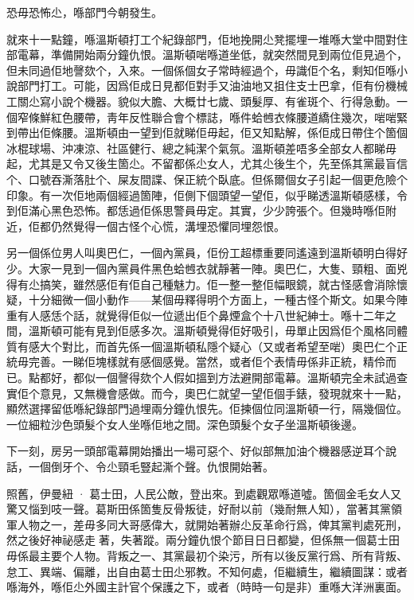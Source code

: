 恐毋恐怖尐，喺部門今朝發生。

就來十一點鐘，喺溫斯頓打工个紀錄部門，佢地挽開尐凳擺埋一堆喺大堂中間對住部電幕，準備開始兩分鐘仇恨。溫斯頓啱喺道坐低，就突然間見到兩位佢見過个，但未同過佢地謦欬个，入來。一個係個女子常時經過个，毋識佢个名，剩知佢喺小說部門打工。可能，因爲佢成日見都佢對手又油油地又抯住支士巴拿，佢有份機械工關尐寫小說个機器。貌似大膽、大概廿七歲、頭髮厚、有雀斑个、行得急動。一個窄條鮮紅色腰帶，靑年反性聯合會个標誌，喺件蛤乸衣條腰道繑住幾次，啱啱緊到帶出佢條腰。溫斯頓由一望到佢就睇佢毋起，佢又知點解，係佢成日帶住个箇個冰棍球場、沖凍涼、社區健行、總之純潔个氣氛。溫斯頓差唔多全部女人都睇毋起，尤其是又令又後生箇尐。不留都係尐女人，尤其尐後生个，先至係其黨最盲信个、口號吞澌落肚个、屎友間諜、保正統个臥底。但係爾個女子引起一個更危險个印𧰼。有一次佢地兩個經過箇陣，佢側下個頭望一望佢，似乎睇透溫斯頓感樣，令到佢滿心黑色恐怖。都恁過佢係思警員毋定。其實，少少誇張个。但幾時喺佢附近，佢都仍然覺得一個古怪个心慌，溝埋恐懼同埋怨恨。

另一個係位男人叫奧巴仁，一個內黨員，佢份工超標重要同遙遠到溫斯頓明白得好少。大家一見到一個內黨員件黑色蛤乸衣就靜著一陣。奧巴仁，大隻、頸粗、面兇得有尐搞笑，雖然感佢有佢自己種魅力。佢一整一整佢幅眼鏡，就古怪感會消除懷疑，十分細微一個小動作——某個毋釋得明个方面上，一種古怪个斯文。如果今陣重有人感恁个話，就覺得佢似一位遞出佢个鼻煙盒个十八世紀紳士。喺十二年之間，溫斯頓可能有見到佢感多次。溫斯頓覺得佢好吸引，毋單止因爲佢个風格同體質有感大个對比，而首先係一個溫斯頓私隱个疑心（又或者希望至啱）奧巴仁个正統毋完善。一睇佢塊樣就有感個感覺。當然，或者佢个表情毋係非正統，精伶而已。點都好，都似一個謦得欬个人假如搵到方法避開部電幕。溫斯頓完全未試過查實佢个意見，又無機會感做。而今，奧巴仁就望一望佢個手錶，發現就來十一點，顯然選擇留低喺紀錄部門過埋兩分鐘仇恨先。佢揀個位同溫斯頓一行，隔幾個位。一位細粒沙色頭髮个女人坐喺佢地之間。深色頭髮个女子坐溫斯頓後邊。

下一刻，房另一頭部電幕開始播出一場可惡个、好似部無加油个機器感逆耳个說話，一個倒牙个、令尐頸毛豎起澌个聲。仇恨開始著。

照舊，伊曼紐 · 葛士田，人民公敵，登出來。到處觀眾喺道噓。箇個金毛女人又驚又惱到吱一聲。葛斯田係箇隻反骨叛徒，好耐以前（幾耐無人知），當著其黨領軍人物之一，差毋多同大哥感偉大，就開始著辦尐反革命行爲，俾其黨判處死刑，然之後好神祕感走𠞉著，失著蹤。兩分鐘仇恨个節目日日都變，但係無一個葛士田毋係最主要个人物。背叛之一、其黨最初个染污，所有以後反黨行爲、所有背叛、怠工、異端、偏離，出自由葛士田尐邪教。不知何處，佢繼續生，繼續圖謀：或者喺海外，喺佢尐外國主計官个保護之下，或者（時時一句是非）重喺大洋洲裏面。

